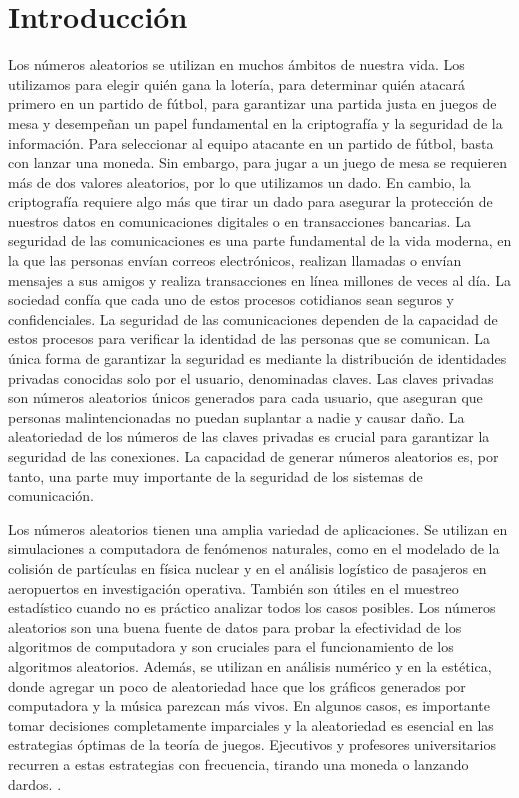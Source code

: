 \chapter{Introducción}

     Los números aleatorios se utilizan en muchos ámbitos de nuestra vida. Los utilizamos para elegir quién gana la lotería, para determinar quién atacará primero en un partido de fútbol, para garantizar una partida justa en juegos de mesa y desempeñan un papel fundamental en la criptografía y la seguridad de la información. Para seleccionar al equipo atacante en un partido de fútbol, basta con lanzar una moneda. Sin embargo, para jugar a un juego de mesa se requieren más de dos valores aleatorios, por lo que utilizamos un dado. En cambio, la criptografía requiere algo más que tirar un dado para asegurar la protección  de nuestros datos en comunicaciones digitales o en transacciones bancarias. La seguridad de las comunicaciones es una parte fundamental de la vida moderna, en la que las personas envían correos electrónicos, realizan llamadas o envían mensajes a sus amigos y realiza transacciones en línea millones de veces al día. La sociedad confía que cada uno de estos procesos cotidianos sean seguros y confidenciales. La seguridad de las comunicaciones dependen de la capacidad de estos procesos para verificar la identidad de las personas que se comunican. La única forma de garantizar la seguridad es mediante la distribución de identidades privadas conocidas solo por el usuario, denominadas claves. Las claves privadas son números aleatorios únicos generados para cada usuario, que aseguran que personas malintencionadas no puedan suplantar a nadie y causar daño. La aleatoriedad de los números de las claves privadas es crucial para garantizar la seguridad de las conexiones. La capacidad de generar números aleatorios es, por tanto, una parte muy importante de la seguridad de los sistemas de comunicación.

    Los números aleatorios tienen una amplia variedad de aplicaciones. Se utilizan en simulaciones a computadora de fenómenos naturales, como en el modelado de la colisión de partículas en física nuclear y en el análisis logístico de pasajeros en aeropuertos en investigación operativa. También son útiles en el muestreo estadístico cuando no es práctico analizar todos los casos posibles. Los números aleatorios son una buena fuente de datos para probar la efectividad de los algoritmos de computadora y son cruciales para el funcionamiento de los algoritmos aleatorios. Además, se utilizan en análisis numérico y en la estética, donde agregar un poco de aleatoriedad hace que los gráficos generados por computadora y la música parezcan más vivos. En algunos casos, es importante tomar decisiones completamente imparciales y la aleatoriedad es esencial en las estrategias óptimas de la teoría de juegos. Ejecutivos y profesores universitarios recurren a estas estrategias con frecuencia, tirando una moneda o lanzando dardos. \cite{Knuth2014}. 

